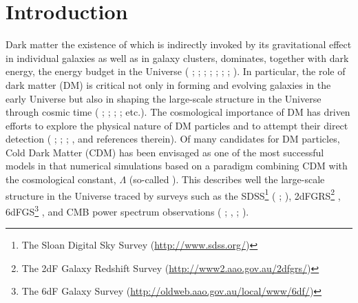 \documentclass[natbib209]{emulateapj}
\begin{document}
\section{Introduction} \label{INTRO}
Dark matter the existence of which is indirectly invoked by its gravitational
effect in individual galaxies as well as in galaxy clusters, dominates, together with dark energy,
the energy budget in the Universe (\citeauthor{Zwicky_1937}
\citeyear{Zwicky_1937}; \citeauthor{van_den_Bergh_1961} \citeyear{van_den_Bergh_1961};
\citeauthor{1970ApJ...159..379R} \citeyear{1970ApJ...159..379R};
\citeauthor{Bosma_1978} \citeyear{Bosma_1978}; \citeauthor{Peebles_1982}
\citeyear{Peebles_1982}; \citeauthor{Riess_1998} \citeyear{Riess_1998};
\citeauthor{Perlmutter_1999} \citeyear{Perlmutter_1999};
\citeauthor{Spergel_2003} \citeyear{Spergel_2003}).
In particular, the role of dark matter (DM) is critical not only in forming and evolving
galaxies in the early Universe but also in shaping the large-scale structure in
the Universe through cosmic time (\citeauthor{Blumenthal_1984}
\citeyear{Blumenthal_1984}; \citeauthor{Colless_2001}
\citeyear{Colless_2001};  \citeauthor{Padmanabhan_2007}
\citeyear{Padmanabhan_2007}; \citeauthor{Jones_2009} \citeyear{Jones_2009};
\citeauthor{2011ApJS..192...18K} \citeyear{2011ApJS..192...18K}
etc.). The cosmological importance of
DM has driven efforts to explore the physical nature of DM 
particles and to attempt their direct detection 
(\citeauthor{Moore_2001} \citeyear{Moore_2001};
\citeauthor{Gaitskell_2004} \citeyear{Gaitskell_2004};
\citeauthor{2012EPJC...72.1971A} \citeyear{2012EPJC...72.1971A}; 
\citeauthor{2014PhRvL.112i1303A} \citeyear{2014PhRvL.112i1303A}, and references
therein). Of many candidates for DM particles, Cold Dark Matter
(CDM) has been envisaged as one of the most successful models in that numerical
simulations based on a paradigm combining CDM with the cosmological constant,
$\Lambda$ (so-called \LCDM). This describes well the large-scale structure in the Universe
traced by surveys such as the SDSS\footnote{The Sloan Digital Sky Survey
(\url{http://www.sdss.org/})} (\citeauthor{2000AJ....120.1579Y}
\citeyear{2000AJ....120.1579Y}; \citeauthor{2004A&A...418....7D} \citeyear{2004A&A...418....7D}), 2dFGRS\footnote{The
2dF Galaxy Redshift Survey (\url{http://www2.aao.gov.au/2dfgrs/})}
\citep{2001MNRAS.328.1039C}, 6dFGS\footnote{The 6dF Galaxy Survey
(\url{http://oldweb.aao.gov.au/local/www/6df/})} \citep{2004MNRAS.355..747J},
and CMB power spectrum observations (\citeauthor{Primack_2003}
\citeyear{Primack_2003}; \citeauthor{Spergel_2003} \citeyear{Spergel_2003},
\citeyear{Spergel_2007}; \citeauthor{2014A&A...566A..54P}
\citeyear{2014A&A...566A..54P}). %
\end{document}

